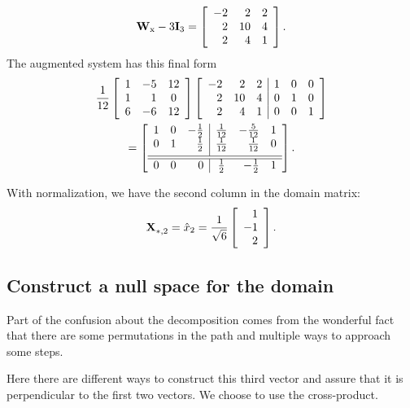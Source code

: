 \begin{enumerate}
\begin{equation}
\W{x}-3\I{3} =
\left[
\begin{array}{rrr}
 -2 & 2 & 2 \\
 2 & 10 & 4 \\
 2 & 4 & 1
\end{array}
\right].
\end{equation}
The augmented system has this final form
\begin{multline}
\frac{1}{12}
\left[
\begin{array}{crc}
 1 & -5 & 12 \\
 1 &  1 & 0 \\
 6 & -6 & 12
\end{array}
\right]
\mat{rrr|ccc}
{
-2 & 2  & 2 & 1 & 0 & 0 \\
 2 & 10 & 4 & 0 & 1 & 0 \\
 2 & 4  & 1 & 0 & 0 & 1
}\\
=
\mat{ccr|crc}
{
1 & 0 & -\frac{1}{2}  &  \frac{1}{12} & -\frac{5}{12} & 1 \\
0 & 1 &  \frac{1}{2}  &  \frac{1}{12} &  \frac{1}{12} & 0 \\[4pt]\hline\hline
0 & 0 & 0             &  \frac{1}{2}  & -\frac{1}{2}  & 1
}.
\end{multline}
\end{enumerate}
With normalization, we have the second column in the domain matrix:
\begin{equation}
  \X{}_{*,2} = \hat{x}_{2} = \frac{1}{\sqrt{6}}\mat{r}{1\\-1\\2}.
\end{equation}

\subsection{Construct a null space for the domain}
Part of the confusion about the decomposition comes from the wonderful fact that there are some permutations in the path and multiple ways to approach some steps.

Here there are different ways to construct this third vector and assure that it is perpendicular to the first two vectors. We choose to use the cross-product.

